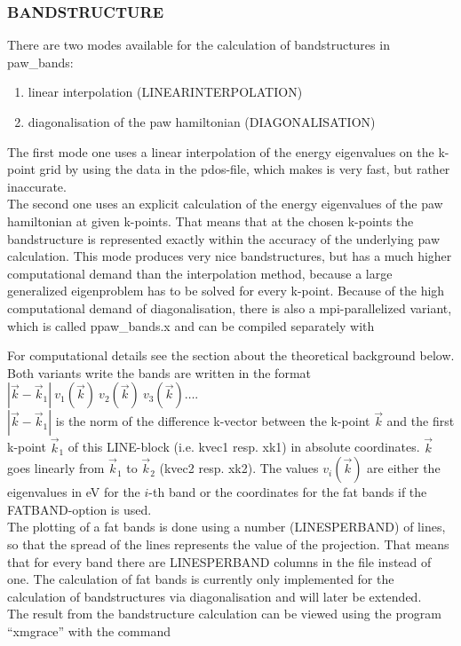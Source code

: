 \documentclass[final,12pt]{article}
\begin{document}
{{{{{{\subsubsection{BANDSTRUCTURE}
There are two modes available for the calculation of bandstructures in 
paw\_bands:
\begin{enumerate}
  \item linear interpolation (LINEARINTERPOLATION)
  \item diagonalisation of the paw hamiltonian (DIAGONALISATION)
\end{enumerate}
The first mode one uses a linear interpolation of the energy eigenvalues on the
k-point grid by using the data in the pdos-file, which makes is very fast, but
rather inaccurate. \\ The second one uses an explicit calculation of the energy
eigenvalues of the paw hamiltonian at given k-points. That means that at the
chosen k-points the bandstructure is represented exactly within the accuracy of
the underlying paw calculation. This mode produces very nice bandstructures, but
has a much higher computational demand than the interpolation method, because a
large generalized eigenproblem has to be solved for every k-point. Because of
the high computational demand of diagonalisation, there is also a
mpi-parallelized variant, which is called ppaw\_bands.x and can be compiled
separately with 

\bigskip{}\bigskip

\noindent
For computational details see the section about
the theoretical background below.\\
Both variants write the bands are written in the format 
$|\vec k-\vec k_1|\ v_1(\vec k)\ v_2(\vec k)\ v_3(\vec k) \ldots $.\\
 $|\vec k-\vec k_1|$ is the norm of the difference k-vector between 
the k-point $\vec k$ and the first k-point $\vec k_1$ of this 
LINE-block (i.e. kvec1 resp. xk1) in absolute coordinates. $\vec k$ 
goes linearly from $\vec k_1$ to $\vec k_2$ (kvec2 resp. xk2).
The values $v_i(\vec k)$ are either the eigenvalues in eV for the 
$i$-th band or the coordinates for the fat bands if the 
FATBAND-option is used.\\
The plotting of a fat bands is done using a number (LINESPERBAND) of lines,
so that the spread of the lines represents the value of the projection. 
That means that for every band there are LINESPERBAND columns in the file 
instead of one. The calculation of fat bands is currently only implemented
for the calculation of bandstructures via diagonalisation and will
later be extended.\\
The result from the bandstructure calculation can be viewed using 
the program ``xmgrace'' with the command

}}}}}}
\end{document}
